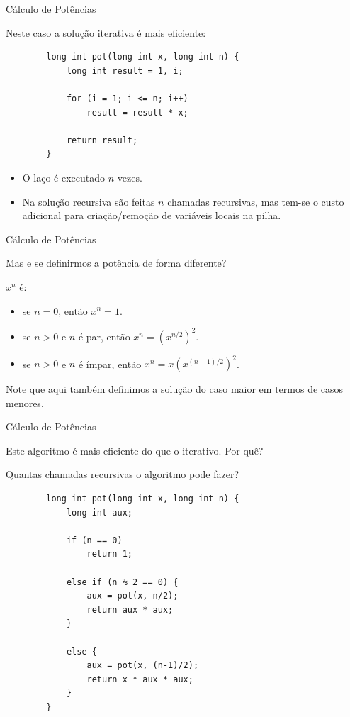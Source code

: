 \documentclass[handout]{beamer}
\begin{document}
\begin{frame}[fragile]{Cálculo de Potências}

    Neste caso a solução iterativa é mais eficiente:

    \begin{verbatim}
        long int pot(long int x, long int n) {
            long int result = 1, i;

            for (i = 1; i <= n; i++)
                result = result * x;

            return result;
        }
    \end{verbatim}
    \pause

    \begin{itemize}
        \item O laço é executado $n$ vezes.
        \item Na solução recursiva são feitas $n$ chamadas recursivas, mas tem-se o custo adicional para criação/remoção de variáveis locais na pilha.
    \end{itemize}
\end{frame}

\begin{frame}[fragile]{Cálculo de Potências}

    Mas e se definirmos a potência de forma diferente?
    \pause

    $x^n$ é:
    \begin{itemize}[<+->]
        \item se $n=0$, então $x^n = 1$.
        \item se $n > 0$ e $n$ é par, então $x^n = (x^{n/2})^2$.
        \item se $n > 0$ e $n$ é ímpar, então $x^n = x(x^{(n-1)/2})^2$.
    \end{itemize}

    \pause
    Note que aqui também definimos a solução do caso maior em termos de casos menores.
\end{frame}

\begin{frame}[fragile]{Cálculo de Potências}

    Este algoritmo é mais eficiente do que o iterativo. Por quê?

    Quantas chamadas recursivas o algoritmo pode fazer?

    \begin{verbatim}
        long int pot(long int x, long int n) {
            long int aux;

            if (n == 0)
                return 1;

            else if (n % 2 == 0) {
                aux = pot(x, n/2);
                return aux * aux;
            }

            else {
                aux = pot(x, (n-1)/2);
                return x * aux * aux;
            }
        }
    \end{verbatim}
\end{frame}
\end{document}

